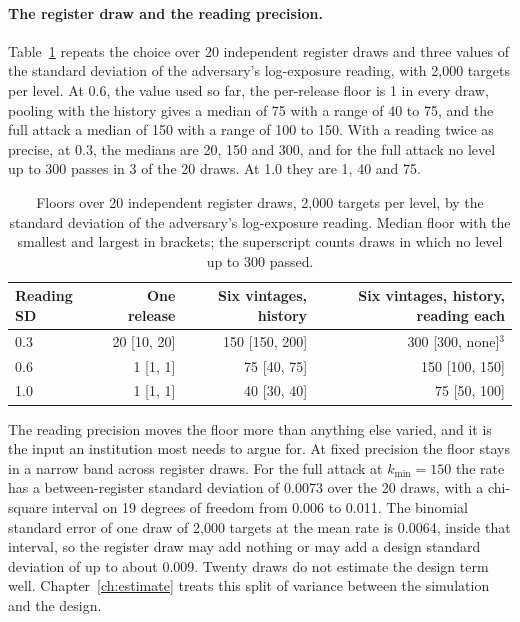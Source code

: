 \paragraph{The register draw and the reading precision.} Table~\ref{c13:tab-rep}
repeats the choice over 20 independent register draws and three values of the
standard deviation of the adversary's log-exposure reading, with 2{,}000 targets per
level. At 0.6, the value used so far, the per-release floor is 1 in every draw,
pooling with the history gives a median of 75 with a range of 40 to 75, and the full
attack a median of 150 with a range of 100 to 150. With a reading twice as precise,
at 0.3, the medians are 20, 150 and 300, and for the full attack no level up to 300
passes in 3 of the 20 draws. At 1.0 they are 1, 40 and 75.

\begin{table}[ht]
\centering
\caption{Floors over 20 independent register draws, 2{,}000 targets per level, by the
standard deviation of the adversary's log-exposure reading. Median floor with the
smallest and largest in brackets; the superscript counts draws in which no level up
to 300 passed.}
\label{c13:tab-rep}
\small
\begin{tabular}{lrrr}
\toprule
Reading SD & One release & Six vintages, history & Six vintages, history, reading each \\
\midrule
0.3 & 20 [10, 20] & 150 [150, 200] & 300 [300, none]$^{3}$ \\
0.6 & 1 [1, 1]    & 75 [40, 75]    & 150 [100, 150] \\
1.0 & 1 [1, 1]    & 40 [30, 40]    & 75 [50, 100] \\
\bottomrule
\end{tabular}
\end{table}

The reading precision moves the floor more than anything else varied, and it is the
input an institution most needs to argue for. At fixed precision the floor stays in a
narrow band across register draws. For the full attack at $k_{\min}=150$ the rate has a
between-register standard deviation of 0.0073 over the 20 draws, with a chi-square
interval on 19 degrees of freedom from 0.006 to 0.011. The binomial standard error of
one draw of 2{,}000 targets at the mean rate is 0.0064, inside that interval, so the
register draw may add nothing or may add a design standard deviation of up to about
0.009. Twenty draws do not estimate the design term well.
Chapter~\ref{ch:estimate} treats this split of variance between the simulation and
the design.

